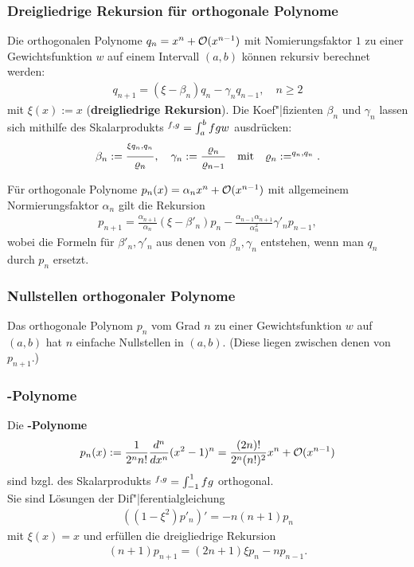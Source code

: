 \pagebreak

\subsubsection{%
    Dreigliedrige Rekursion für orthogonale Polynome%
}

Die orthogonalen Polynome $q_n = x^n + \mathcal{O}(x^{n-1})$ mit Nomierungsfaktor $1$
zu einer Gewichtsfunktion $w$ auf einem Intervall $(a, b)$ können rekursiv
berechnet werden:
\begin{align*}
    q_{n+1} = (\xi - \beta_n) q_n - \gamma_n q_{n-1},\quad
    n \ge 2
\end{align*}
mit $\xi(x) := x$
(\textbf{dreigliedrige Rekursion}).
Die Koef"|fizienten $\beta_n$ und $\gamma_n$ lassen sich mithilfe des
Skalarprodukts
$\sp{f, g} = \int_a^b f g w$ ausdrücken:
\begin{align*}
    \beta_n := \frac{\sp{\xi q_n, q_n}}{\varrho_n},\quad
    \gamma_n := \frac{\varrho_n}{\varrho_{n-1}}
    \quad\text{mit}\quad \varrho_n := \sp{q_n, q_n}.
\end{align*}

Für orthogonale Polynome $p_n(x) = \alpha_n x^n + \mathcal{O}(x^{n-1})$ mit
allgemeinem Normierungsfaktor $\alpha_n$ gilt die Rekursion
\begin{align*}
    p_{n+1} = \frac{\alpha_{n+1}}{\alpha_n} (\xi - \beta'_n) p_n -
    \frac{\alpha_{n-1} \alpha_{n+1}}{\alpha_n^2} \gamma'_n p_{n-1},
\end{align*}
wobei die Formeln für $\beta'_n, \gamma'_n$ aus denen von $\beta_n, \gamma_n$
entstehen, wenn man $q_n$ durch $p_n$ ersetzt.

\subsubsection{%
    Nullstellen orthogonaler Polynome%
}

Das orthogonale Polynom $p_n$ vom Grad $n$ zu einer Gewichtsfunktion $w$
auf $(a, b)$ hat $n$ einfache Nullstellen in $(a, b)$.
(Diese liegen zwischen denen von $p_{n+1}$.)

\subsubsection{%
    -Polynome%
}

Die \textbf{-Polynome}
\begin{align*}
    p_n(x) := \frac{1}{2^n n!} \frac{d^n}{dx^n} (x^2 - 1)^n
    = \frac{(2n)!}{2^n (n!)^2} x^n + \mathcal{O}(x^{n-1})
\end{align*}
sind bzgl. des Skalarprodukts $\sp{f, g} = \int_{-1}^1 f g$
orthogonal. \\
Sie sind Lösungen der Dif"|ferentialgleichung
\begin{align*}
    ((1 - \xi^2) p'_n)' = -n (n + 1) p_n
\end{align*}
mit $\xi(x) = x$ und erfüllen die dreigliedrige Rekursion
\begin{align*}
    (n + 1) p_{n+1} = (2n + 1) \xi p_n - n p_{n-1}.
\end{align*}


